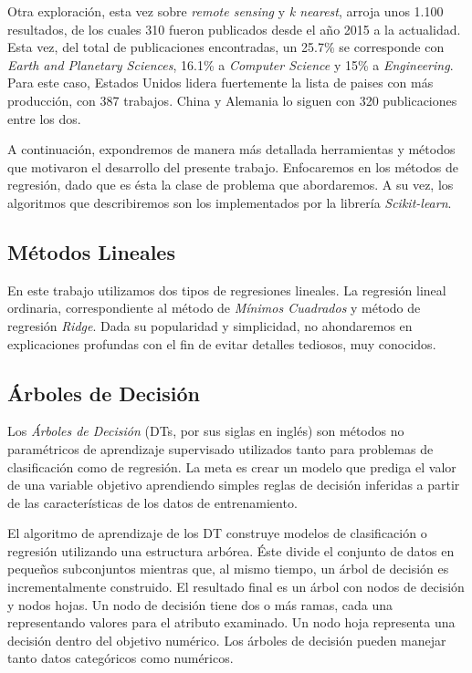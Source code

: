     \par Otra exploración, esta vez sobre \textit{remote sensing} y \textit{k nearest},
      arroja unos 1.100 resultados, de los cuales 310 fueron publicados desde
      el año 2015 a la actualidad. Esta vez, del total de publicaciones encontradas,
      un 25.7\% se corresponde con \textit{Earth and Planetary Sciences}, 16.1\%
      a \textit{Computer Science} y 15\% a \textit{Engineering}. Para este caso,
      Estados Unidos lidera fuertemente la lista de paises con más producción,
      con 387 trabajos. China y Alemania lo siguen con 320 publicaciones entre
      los dos.


    \par A continuación, expondremos de manera más detallada
      herramientas y métodos que motivaron el desarrollo del presente
      trabajo. Enfocaremos en los métodos de regresión, dado que es ésta la clase
      de problema que abordaremos. A su vez, los algoritmos que describiremos son
      los implementados por la librería \textit{Scikit-learn}\cite{scikit-learn}.


  \subsection{Métodos Lineales}

    \par En este trabajo utilizamos dos tipos de regresiones lineales. La regresión
    lineal ordinaria, correspondiente al método de \textit{Mínimos Cuadrados}\cite{least_square}
    y método de regresión \textit{Ridge}\cite{ridge}.
    Dada su popularidad y simplicidad, no ahondaremos en explicaciones profundas
    con el fin de evitar detalles tediosos, muy conocidos.


  \subsection{Árboles de Decisión}
    \par Los \textit{Árboles de Decisión} (DTs, por sus siglas en inglés)\cite{decision_tree_regression}
      son métodos no paramétricos de aprendizaje supervisado
      utilizados tanto para problemas de clasificación como de regresión.
      La meta es crear un modelo que prediga el valor de una variable objetivo aprendiendo
      simples reglas de decisión inferidas a partir de las características de los datos
      de entrenamiento.


    \par El algoritmo de aprendizaje de los DT construye modelos de clasificación o regresión
      utilizando una estructura arbórea. Éste divide el conjunto de datos en pequeños
      subconjuntos mientras que, al mismo tiempo, un árbol de decisión es incrementalmente
      construido. El resultado final es un árbol con nodos de decisión y nodos hojas.
      Un nodo de decisión tiene dos o más ramas, cada una representando valores para
      el atributo examinado. Un nodo hoja representa una decisión dentro del
      objetivo numérico. Los árboles de decisión pueden manejar tanto datos
      categóricos como numéricos.


